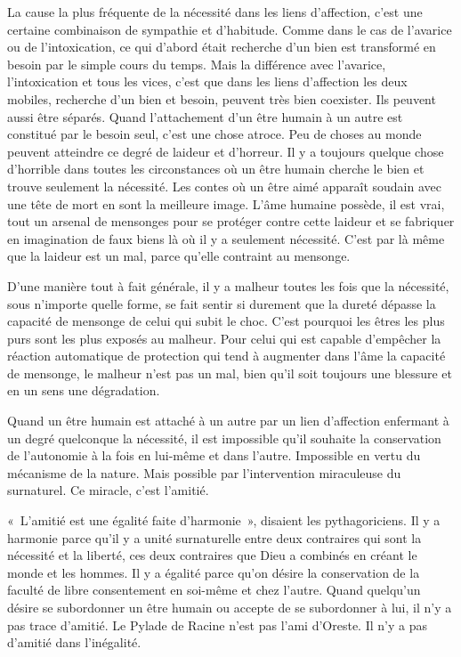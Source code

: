 \documentclass[french,twoside]{book} %
\begin{document}
La cause la plus fréquente de la nécessité dans les liens d'affection, c'est une certaine combinaison de sympathie et d'habitude. Comme dans le cas de l'avarice ou de l'intoxication, ce qui d'abord était recherche d'un bien est transformé en besoin par le simple cours du temps. Mais la différence avec l'avarice, l'intoxication et tous les vices, c'est que dans les liens d'affection les deux mobiles, recherche d'un bien et besoin, peuvent très bien coexister. Ils peuvent aussi être séparés. Quand l'attachement d'un être humain à un autre est constitué par le besoin seul, c'est une chose atroce. Peu de choses au monde peuvent atteindre ce degré de laideur et d'horreur. Il y a toujours quelque chose d'horrible dans toutes les circonstances où un être humain cherche le bien et trouve seulement la nécessité. Les contes où un être aimé apparaît soudain avec une tête de mort en sont la meilleure image. L'âme humaine possède, il est vrai, tout un arsenal de mensonges pour se protéger contre cette laideur et se fabriquer en imagination de faux biens là où il y a seulement nécessité. C'est par là même que la laideur est un mal, parce qu'elle contraint au mensonge.\par
D'une manière tout à fait générale, il y a malheur toutes les fois que la nécessité, sous n'importe quelle forme, se fait sentir si durement que la dureté dépasse la capacité de mensonge de celui qui subit le choc. C'est pourquoi les êtres les plus purs sont les plus exposés au malheur. Pour celui qui est capable d'empêcher la réaction automatique de protection qui tend à augmenter dans l'âme la capacité de mensonge, le malheur n'est pas un mal, bien qu'il soit toujours une blessure et en un sens une dégradation.\par
Quand un être humain est attaché à un autre par un lien d'affection enfermant à un degré quelconque la nécessité, il est impossible qu'il souhaite la conservation de l'autonomie à la fois en lui-même et dans l'autre. Impossible en vertu du mécanisme de la nature. Mais possible par l'intervention miraculeuse du surnaturel. Ce miracle, c'est l'amitié.\par
« L'amitié est une égalité faite d'harmonie », disaient les pythagoriciens. Il y a harmonie parce qu'il y a unité surnaturelle entre deux contraires qui sont la nécessité et la liberté, ces deux contraires que Dieu a combinés en créant le monde et les hommes. Il y a égalité parce qu'on désire la conservation de la faculté de libre consentement en soi-même et chez l'autre. Quand quelqu'un désire se subordonner un être humain ou accepte de se subordonner à lui, il n'y a pas trace d'amitié. Le Pylade de Racine n'est pas l'ami d'Oreste. Il n'y a pas d'amitié dans l'inégalité.\par
\end{document}
